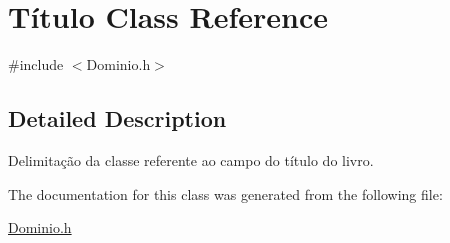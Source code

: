 \hypertarget{class_t_xC3_xADtulo}{}\section{Título Class Reference}
\label{class_t_xC3_xADtulo}


{\ttfamily \#include $<$Dominio.\+h$>$}



\subsection{Detailed Description}
Delimitação da classe referente ao campo do título do livro. 

The documentation for this class was generated from the following file\+:\begin{DoxyCompactItemize}
\item 
\hyperlink{_dominio_8h}{Dominio.\+h}\end{DoxyCompactItemize}
